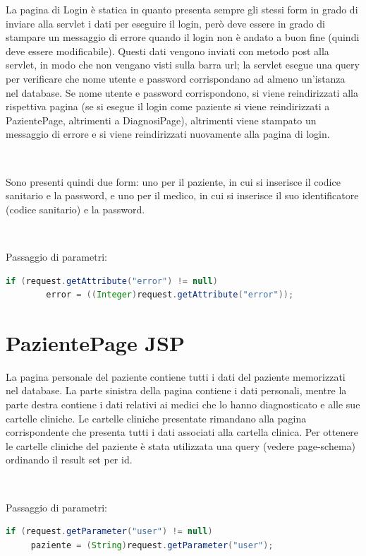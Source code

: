 \documentclass[a4paper,titlepage]{article}
\begin{document}
La pagina di Login è statica in quanto presenta sempre gli stessi form in grado di inviare alla servlet i dati per eseguire il login, però deve essere in grado di stampare un messaggio di errore quando il login non è andato a buon fine (quindi deve essere modificabile). Questi dati vengono inviati con metodo post alla servlet, in modo che non vengano visti sulla barra url; la servlet esegue una query per verificare che nome utente e password corrispondano ad almeno un'istanza nel database. Se nome utente e password corrispondono, si viene reindirizzati alla rispettiva pagina (se si esegue il login come paziente si viene reindirizzati a PazientePage, altrimenti a DiagnosiPage), altrimenti viene stampato un messaggio di errore e si viene reindirizzati nuovamente alla pagina di login.

~

Sono presenti quindi due form: uno per il paziente, in cui si inserisce il codice sanitario e la password, e uno per il medico, in cui si inserisce il suo identificatore (codice sanitario) e la password.


~

Passaggio di parametri: 

\begin{lstlisting}[language=java]
	 if (request.getAttribute("error") != null)
 		error = ((Integer)request.getAttribute("error"));
\end{lstlisting}

\section{PazientePage JSP}

La pagina personale del paziente contiene tutti i dati del paziente memorizzati nel database. La parte sinistra della pagina contiene i dati personali, mentre la parte destra contiene i dati relativi ai medici che lo hanno diagnosticato e alle sue cartelle cliniche. Le cartelle cliniche presentate rimandano alla pagina corrispondente che presenta tutti i dati associati alla cartella clinica. Per ottenere le cartelle cliniche del paziente è stata utilizzata una query (vedere page-schema) ordinando il result set per id.


~

Passaggio di parametri: 

\begin{lstlisting}[language=java]
 if (request.getParameter("user") != null)
	 paziente = (String)request.getParameter("user");

\end{lstlisting}
\end{document}
